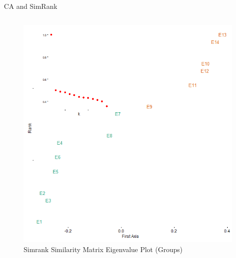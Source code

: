 \documentclass[
  ignorenonframetext,
]{beamer}
\begin{document}
\begin{frame}{CA and SimRank}
\begin{columns}[T]
\begin{column}{0.5\textwidth}
\begin{figure}
{\centering \includegraphics{Plots/sr-plot-eigen-g.png}

}

\caption{Simrank Similarity Matrix Eigenvalue Plot (Groups)}

\end{figure}
\end{column}
\end{columns}
\end{frame}
\end{document}
